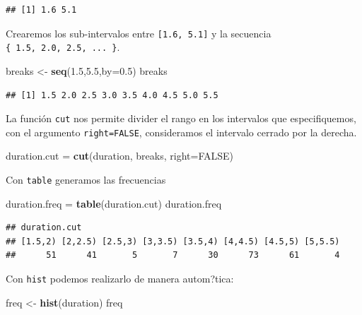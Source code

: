 \documentclass[]{book}
\newenvironment{Shaded}{\begin{snugshade}}{\end{snugshade}}
\newcommand{\KeywordTok}[1]{\textcolor[rgb]{0.13,0.29,0.53}{\textbf{#1}}}
\newcommand{\DataTypeTok}[1]{\textcolor[rgb]{0.13,0.29,0.53}{#1}}
\newcommand{\FloatTok}[1]{\textcolor[rgb]{0.00,0.00,0.81}{#1}}
\newcommand{\StringTok}[1]{\textcolor[rgb]{0.31,0.60,0.02}{#1}}
\newcommand{\OtherTok}[1]{\textcolor[rgb]{0.56,0.35,0.01}{#1}}
\newcommand{\NormalTok}[1]{#1}
\begin{document}
\begin{verbatim}
## [1] 1.6 5.1
\end{verbatim}

Crearemos los sub-intervalos entre \texttt{{[}1.6,\ 5.1{]}} y la
secuencia \texttt{\{\ 1.5,\ 2.0,\ 2.5,\ ...\ \}}.

\begin{Shaded}
\begin{Highlighting}[]
\NormalTok{breaks <-}\StringTok{ }\KeywordTok{seq}\NormalTok{(}\FloatTok{1.5}\NormalTok{,}\FloatTok{5.5}\NormalTok{,}\DataTypeTok{by=}\FloatTok{0.5}\NormalTok{)}
\NormalTok{breaks}
\end{Highlighting}
\end{Shaded}

\begin{verbatim}
## [1] 1.5 2.0 2.5 3.0 3.5 4.0 4.5 5.0 5.5
\end{verbatim}

La función \texttt{cut} nos permite divider el rango en los intervalos
que especifiquemos, con el argumento \texttt{right=FALSE}, consideramos
el intervalo cerrado por la derecha.

\begin{Shaded}
\begin{Highlighting}[]
\NormalTok{duration.cut =}\StringTok{ }\KeywordTok{cut}\NormalTok{(duration, breaks, }\DataTypeTok{right=}\OtherTok{FALSE}\NormalTok{) }
\end{Highlighting}
\end{Shaded}

Con \texttt{table} generamos las frecuencias

\begin{Shaded}
\begin{Highlighting}[]
\NormalTok{duration.freq =}\StringTok{ }\KeywordTok{table}\NormalTok{(duration.cut) }
\NormalTok{duration.freq}
\end{Highlighting}
\end{Shaded}

\begin{verbatim}
## duration.cut
## [1.5,2) [2,2.5) [2.5,3) [3,3.5) [3.5,4) [4,4.5) [4.5,5) [5,5.5) 
##      51      41       5       7      30      73      61       4
\end{verbatim}

Con \texttt{hist} podemos realizarlo de manera autom?tica:

\begin{Shaded}
\begin{Highlighting}[]
\NormalTok{freq <-}\StringTok{ }\KeywordTok{hist}\NormalTok{(duration)}
\NormalTok{freq}
\end{Highlighting}
\end{Shaded}
\end{document}
